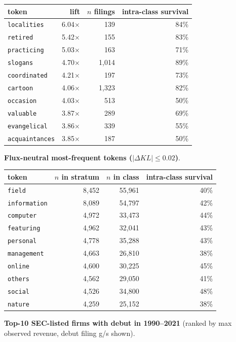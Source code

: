 \begin{tabular}{lrrr}
\toprule
token & lift & $n$ filings & intra-class survival \\
\midrule
\texttt{localities} & 6.04$\times$ & 139 & 84\% \\
\texttt{retired} & 5.42$\times$ & 155 & 83\% \\
\texttt{practicing} & 5.03$\times$ & 163 & 71\% \\
\texttt{slogans} & 4.70$\times$ & 1,014 & 89\% \\
\texttt{coordinated} & 4.21$\times$ & 197 & 73\% \\
\texttt{cartoon} & 4.06$\times$ & 1,323 & 82\% \\
\texttt{occasion} & 4.03$\times$ & 513 & 50\% \\
\texttt{valuable} & 3.87$\times$ & 289 & 69\% \\
\texttt{evangelical} & 3.86$\times$ & 339 & 55\% \\
\texttt{acquaintances} & 3.85$\times$ & 187 & 50\% \\
\bottomrule
\end{tabular}

\textbf{Flux-neutral most-frequent tokens ($|\Delta KL|\leq 0.02$)}.

\begin{tabular}{lrrr}
\toprule
token & $n$ in stratum & $n$ in class & intra-class survival \\
\midrule
\texttt{field} & 8,452 & 55,961 & 40\% \\
\texttt{information} & 8,089 & 54,797 & 42\% \\
\texttt{computer} & 4,972 & 33,473 & 44\% \\
\texttt{featuring} & 4,962 & 32,041 & 43\% \\
\texttt{personal} & 4,778 & 35,288 & 43\% \\
\texttt{management} & 4,663 & 26,810 & 38\% \\
\texttt{online} & 4,600 & 30,225 & 45\% \\
\texttt{others} & 4,562 & 29,050 & 41\% \\
\texttt{social} & 4,526 & 34,800 & 48\% \\
\texttt{nature} & 4,259 & 25,152 & 38\% \\
\bottomrule
\end{tabular}

\textbf{Top-10 SEC-listed firms with debut in 1990--2021} (ranked by max observed revenue, debut filing g/s shown).

